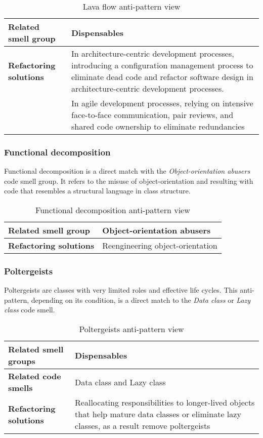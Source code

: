\begin{table}[ht!]
\centering
\caption{Lava flow anti-pattern view}
\label{table:LavaFlow}
    \begin{tabular}{ p{5cm} p{9cm} }
     \hline
     \textbf{Related smell group}   &Dispensables\\ 
     \hline
     \textbf{Refactoring solutions}  &In architecture-centric development processes, introducing a configuration management process to eliminate dead code and refactor software design in architecture-centric development processes.\\ 
     &In agile development processes, relying on intensive face-to-face communication, pair reviews, and shared code ownership to eliminate redundancies \\
     \hline
    \end{tabular}
\end{table}

\subsubsection*{Functional decomposition}
Functional decomposition is a direct match with the \textit{Object-orientation abusers} code smell group. It refers to the misuse of object-orientation and resulting with code that resembles a structural language in class structure.

\begin{table}[ht!]
\centering
\caption{Functional decomposition anti-pattern view}
\label{table:functionalDecomposition}
    \begin{tabular}{ p{5cm} p{9cm} }
     \hline
     \textbf{Related smell group}   &Object-orientation abusers\\ 
     \hline
     \textbf{Refactoring solutions}  &Reengineering object-orientation\\
     \hline
    \end{tabular}
\end{table}


\subsubsection*{Poltergeists}
Poltergeists are classes with very limited roles and effective life cycles. This anti-pattern, depending on its condition, is a direct match to the \textit{Data class} or \textit{Lazy class} code smell.

\begin{table}[ht!]
\centering
\caption{Poltergeists anti-pattern view}
\label{table:Poltergeists}
    \begin{tabular}{ p{5cm} p{9cm} }
     \hline
     \textbf{Related smell groups}  &Dispensables\\
     \hline
     \textbf{Related code smells}  &Data class and Lazy class\\
     \hline
     \textbf{Refactoring solutions}  &Reallocating responsibilities to longer-lived objects that help mature data classes or eliminate lazy classes, as a result remove poltergeists\\
     \hline
    \end{tabular}
\end{table}

